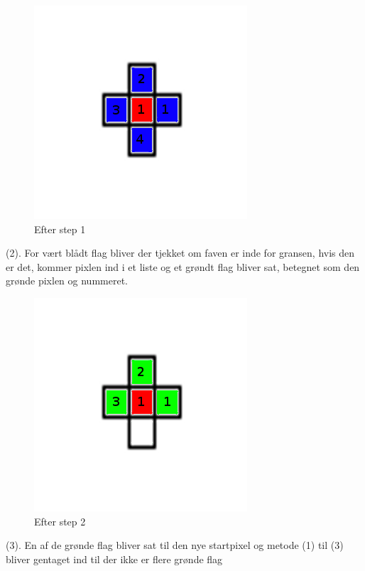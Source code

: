 \begin{figure}[h]
	\begin{center}
		\includegraphics[scale=0.42,angle=0]{afsnit/vores_implementation/billeder/flood_fill/floodfill2}
	\end{center}
	\caption[]{Efter step 1}
	\label{floodfill2}
\end{figure}

(2). For vært blådt flag bliver der tjekket om faven er inde for
gransen, hvis den er det, kommer pixlen ind i et liste og et grøndt flag
bliver sat, betegnet som den grønde pixlen og nummeret.

\begin{figure}[h]
	\begin{center}
		\includegraphics[scale=0.42,angle=0]{afsnit/vores_implementation/billeder/flood_fill/floodfill3}
	\end{center}
	\caption[]{Efter step 2}
	\label{floodfill3}
\end{figure}

(3). En af de grønde flag bliver sat til den nye startpixel og metode
(1) til (3) bliver gentaget ind til der ikke er flere grønde flag 

